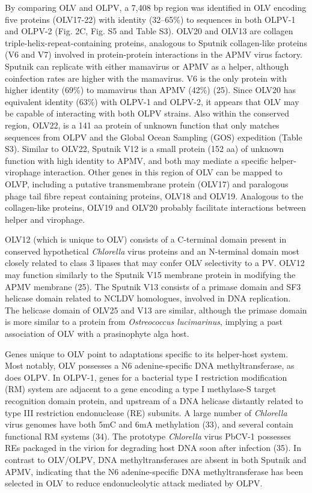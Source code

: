 By comparing OLV and OLPV, a 7,408 bp region was identified in OLV encoding five proteins (OLV17-22) with identity (32--65\%) to sequences in both OLPV-1 and OLPV-2 (Fig. 2C, Fig. S5 and Table S3). 
OLV20 and OLV13 are collagen triple-helix-repeat-containing proteins, analogous to Sputnik collagen-like proteins (V6 and V7) involved in protein-protein interactions in the APMV virus factory. 
Sputnik can replicate with either mamavirus or APMV as a helper, although coinfection rates are higher with the mamavirus. 
V6 is the only protein with higher identity (69\%) to mamavirus than APMV (42\%) (25). 
Since OLV20 has equivalent identity (63\%) with OLPV-1 and OLPV-2, it appears that OLV may be capable of interacting with both OLPV strains. 
Also within the conserved region, OLV22, is a 141 aa protein of unknown function that only matches sequences from OLPV and the Global Ocean Sampling (GOS) expedition (Table S3). 
Similar to OLV22, Sputnik V12 is a small protein (152 aa) of unknown function with high identity to APMV, and both may mediate a specific helper-virophage interaction. 
Other genes in this region of OLV can be mapped to OLVP, including a putative transmembrane protein (OLV17) and paralogous phage tail fibre repeat containing proteins, OLV18 and OLV19. 
Analogous to the collagen-like proteins, OLV19 and OLV20 probably facilitate interactions between helper and virophage. 

OLV12 (which is unique to OLV) consists of a C-terminal domain present in conserved hypothetical \textit{Chlorella} virus proteins and an N-terminal domain most closely related to class 3 lipases that may confer OLV selectivity to a PV. 
OLV12 may function similarly to the Sputnik V15 membrane protein in modifying the APMV membrane (25). 
The Sputnik V13 consists of a primase domain and SF3 helicase domain related to NCLDV homologues, involved in DNA replication. 
The helicase domain of OLV25 and V13 are similar, although the primase domain is more similar to a protein from \textit{Ostreococcus lucimarinus}, implying a past association of OLV with a prasinophyte alga host. 

Genes unique to OLV point to adaptations specific to its helper-host system. 
Most notably, OLV possesses a N6 adenine-specific DNA methyltransferase, as does OLPV. 
In OLPV-1, genes for a bacterial type I restriction modification (RM) system are adjacent to a gene encoding a type I methylase-S target recognition domain protein, and upstream of a DNA helicase distantly related to type III restriction endonuclease (RE) subunits. 
A large number of \textit{Chlorella} virus genomes have both 5mC and 6mA methylation (33), and several contain functional RM systems (34). 
The prototype \textit{Chlorella} virus PbCV-1 possesses REs packaged in the virion for degrading host DNA soon after infection (35). 
In contrast to OLV/OLPV, DNA methyltransferases are absent in both Sputnik and APMV, indicating that the N6 adenine-specific DNA methyltransferase has been selected in OLV to reduce endonucleolytic attack mediated by OLPV. 

